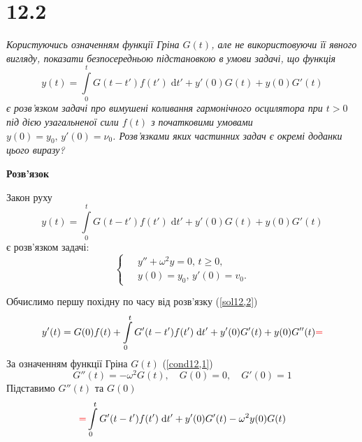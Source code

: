 %
%
%
%
%

\section[Задача №12.2]{12.2}

\textit{Користуючись означенням функції Гріна $G(t)$, але не використовуючи її явного вигляду, показати безпосередньою підстановкою в умови задачі, що функція \[y(t) = \int\limits_0^t G(t - t') f(t') \;\mathrm{d}t' + y'(0) G(t) + y(0) G'(t)\] є розв’язком задачі про вимушені коливання гармонічного осцилятора при $t>0$ під дією узагальненої сили $f(t)$ з початковими умовами $y(0)=y_0, \, y'(0)=\nu_0$. Розв’язками яких частинних задач є окремі доданки цього виразу?}

\begin{center}
    \large{\textbf{Розв'язок}}
\end{center}

Закон руху  
\begin{equation} \label{sol12,2}
    y(t) = \int\limits_0^t G(t - t') f(t') \;\mathrm{d}t' + y'(0) G(t) + y(0) G'(t)
\end{equation}
є розв'язком задачі:
\begin{equation} \label{cond12,2}
    \left\{ \begin{aligned}
        \;&y'' + \omega^2y = 0,\, t \geq 0,\\
          &y(0) = y_0,\, y'(0) = v_0.
    \end{aligned} \right.
\end{equation}

Обчислимо першу похідну по часу від розв'язку (\ref{sol12,2})
\begin{equation*} 
    y'(t) = G(0)f(t) + \int\limits_0^t G'(t - t') f(t') \;\mathrm{d}t' + y'(0) G'(t) + y(0) G''(t) \textcolor{red}{=}
\end{equation*}
За означенням функції Гріна $G(t)$ (\ref{cond12,1})
\begin{equation*}
    G''(t) = -\omega^2 G(t), \quad G(0) = 0, \quad G'(0) = 1
\end{equation*}
Підставимо $G''(t)$ та $G(0)$
\begin{equation*} 
    \textcolor{red}{=} \int\limits_0^t G'(t - t') f(t') \;\mathrm{d}t' + y'(0) G'(t) - \omega^2 y(0)G(t) 
\end{equation*}

